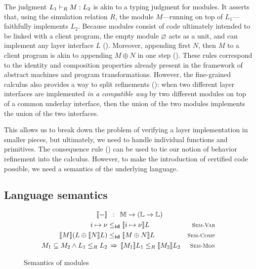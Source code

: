 The judgment $L_1 \vdash_{R} M : L_2$ is akin to a typing judgment for
modules. It asserts that, using the simulation relation $R$, the
module $M$---running on top of $L_1$---faithfully implements $L_2$.
Because modules consist of code ultimately intended to be linked
with a client program, the empty module $\varnothing$ acts as a
unit, and can implement any layer interface $L$ 
().  Moreover, appending first $N$, then $M$ to a
client program is akin to appending $M \oplus N$ in one step
().  These rules correspond to the identity and
composition properties already present in the framework of abstract
machines and program transformations.  However, the fine-grained
calculus also provides a way to split refinements ():
when two different layer interfaces are implemented \emph{in a
  compatible way} by two different modules on top of a common underlay
interface, then the union of the two modules implements the union of
the two interfaces.

This allows us to break down the problem of verifying a layer
implementation in smaller pieces, but ultimately, we need to handle
individual functions and primitives.  The consequence rule
() can be used to tie our notion of behavior
refinement into the calculus.  However, to make the introduction of
certified code possible, we need a semantics of the underlying
language.

\subsection{Language semantics}
\label{ssec:layer-langsem}

\begin{figure}[t]
\begin{align*}%
\llbracket - \rrbracket &\ \,:\ \,\mathbb{M} \rightarrow (\mathbb{L} \rightarrow \mathbb{L}) \\
        i \mapsto \nu &\lpath{\id}
            \llbracket i \mapsto \nu \rrbracket L &
            \rulename{Sem-Var} \\
        \llbracket M \rrbracket (L \oplus \llbracket N \rrbracket L)
            &\lpath{\id}
            \llbracket M \oplus N \rrbracket L &
            \rulename{Sem-Comp} \\
        M_1 \subseteq M_2 \wedge L_1 \lpath{R} L_2 &\,\Rightarrow\,
            \llbracket M_1 \rrbracket L_1 \lpath{R}
            \llbracket M_2 \rrbracket L_2 &
            \rulename{Sem-Mon}%
\end{align*}
\caption{Semantics of modules}
\label{fig:msem}
\hrulefill
    \afterpage{\FloatBarrier}
\end{figure}

